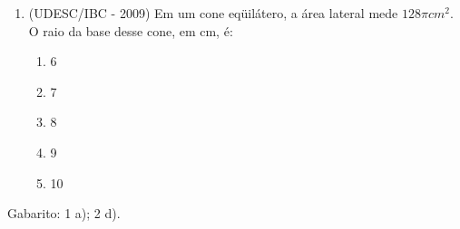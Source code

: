 \begin{enumerate}
 \item (UDESC/IBC - 2009) Em um cone eqüilátero, a área lateral mede $128 \pi cm^2$. O raio da base desse cone, em cm, é:
 \begin{enumerate}
  \item 6
  \item 7
  \item 8
  \item 9
  \item 10
 \end{enumerate}

 \end{enumerate}

 Gabarito: 1 a); 2 d).
